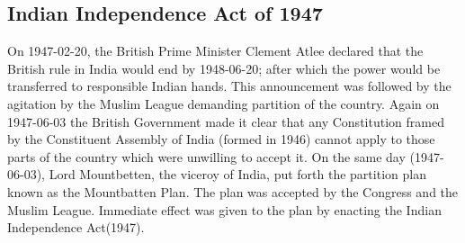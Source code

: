 \begin{multicols}{2}
\subsection{Indian Independence Act of 1947}
On 1947-02-20, the British Prime Minister Clement Atlee declared that the British rule in India would end by 1948-06-20; after which the power would be transferred to responsible Indian hands. This announcement was followed by the agitation by the Muslim League demanding partition of the country. Again on 1947-06-03 the British Government made it clear that any Constitution framed by the Constituent Assembly of India (formed in 1946) cannot apply to those parts of the country which were unwilling to accept it. On the same day (1947-06-03), Lord Mountbetten, the viceroy of India, put forth the partition plan known as the Mountbatten Plan. The plan was accepted by the Congress and the Muslim League. Immediate effect was given to the plan by enacting the Indian Independence Act\endnote (1947).


\end{multicols}
